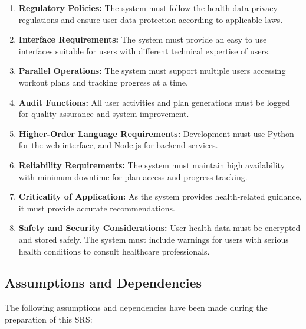 \documentclass[12pt,a4paper]{article}
\begin{document}
\begin{enumerate}
    \item \textbf{Regulatory Policies:} The system must follow the health data privacy regulations and ensure user data protection according to applicable laws.
    
    
    \item \textbf{Interface Requirements:} The system must provide an easy to use interfaces suitable for users with different technical expertise of users.
    
    \item \textbf{Parallel Operations:} The system must support multiple users accessing workout plans and tracking progress at a time.
    
    \item \textbf{Audit Functions:} All user activities and plan generations must be logged for quality assurance and system improvement.
    
    \item \textbf{Higher-Order Language Requirements:} Development must use Python for the web interface, and Node.js for backend services.
    
    \item \textbf{Reliability Requirements:} The system must maintain high availability with minimum downtime for plan access and progress tracking.
    
    \item \textbf{Criticality of Application:} As the system provides health-related guidance, it must provide accurate recommendations.
    
    \item \textbf{Safety and Security Considerations:} User health data must be encrypted and stored safely. The system must include warnings for users with serious health conditions to consult healthcare professionals.
\end{enumerate}

\subsection{Assumptions and Dependencies}
\label{sec:assumptions}
The following assumptions and dependencies have been made during the preparation of this SRS:
\end{document}
